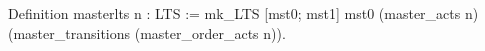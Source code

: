 Definition masterlts n : LTS := 
    mk_LTS [mst0; mst1] mst0 (master_acts n) 
             (master_transitions (master_order_acts n)).